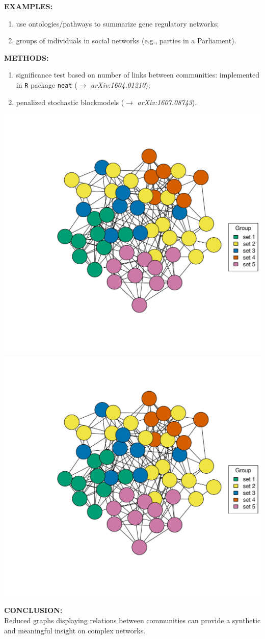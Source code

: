 \documentclass[a0paper,portrait]{baposter}
\begin{document}
\begin{poster}
{\vspace{0.1cm}
\textbf{EXAMPLES:}\\\vspace{-0.65cm}
\begin{enumerate}
	\itemsep-3pt
	\item use ontologies/pathways to summarize gene regulatory networks;
	\item groups of individuals in social networks \small{(e.g., parties in a Parliament)}.
\end{enumerate}\vspace{-0.1cm}
\textbf{METHODS:}\\\vspace{-0.65cm}
\begin{enumerate}
	\itemsep-3pt
	\item significance test based on number of links between communities: implemented in \texttt{R} package \texttt{neat} ($\rightarrow$ \textit{arXiv:1604.01210});
	\item penalized stochastic blockmodels ($\rightarrow$ \textit{arXiv:1607.08743}).
\end{enumerate}
\begin{center}
	\includegraphics[width=0.45\linewidth, page=1, trim=0cm 3cm 0cm 3cm]{example-mirko.pdf}
	\includegraphics[width=0.45\linewidth, page=2, trim=0cm 3cm 0cm 3cm]{example-mirko.pdf}
\end{center}
\vspace{-0.3cm}
\textbf{CONCLUSION:}\\
Reduced graphs displaying relations between communities can provide a synthetic and meaningful insight on complex networks.

}
\end{poster}
\end{document}
